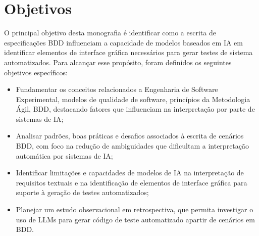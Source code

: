 \section{Objetivos}
\label{subsec:objetivos-pesquisa}

O principal objetivo desta monografia é identificar como a escrita de especificações BDD influenciam a capacidade de modelos baseados em IA em identificar elementos de interface gráfica necessários para gerar testes de sistema automatizados. Para alcançar esse propósito, foram definidos os seguintes objetivos específicos:

\begin{itemize} 
    \item Fundamentar os conceitos relacionados a Engenharia de Software Experimental, modelos de qualidade de software, princípios da Metodologia Ágil, BDD, destacando fatores que influenciam na interpretação por parte de sistemas de IA; 
    \item Analisar padrões, boas práticas e desafios associados à escrita de cenários BDD, com foco na redução de ambiguidades que dificultam a interpretação automática por sistemas de IA; 
    \item Identificar limitações e capacidades de modelos de IA na interpretação de requisitos textuais e na identificação de elementos de interface gráfica para suporte à geração de testes automatizados;
    \item Planejar um estudo observacional em retrospectiva, que permita investigar o uso de LLMs para gerar código de teste automatizado apartir de cenários em BDD.
\end{itemize}